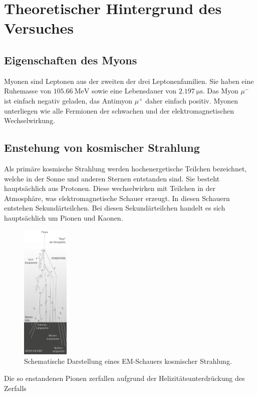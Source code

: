 \section{Theoretischer Hintergrund des Versuches}
\label{sec:Theorie}
\subsection{Eigenschaften des Myons}
\label{subsec:Eigenschaften}
Myonen sind Leptonen aus der zweiten der drei Leptonenfamilien. Sie haben
eine Ruhemasse von $\SI{105.66}{\mega\electronvolt}$ sowie eine Lebensdauer
von $\SI{2.197}{\micro\second}$. Das Myon $\mu^{-}$ ist einfach negativ geladen,
das Antimyon $\mu^{+}$ daher einfach positiv.\cite{PDG}
Myonen unterliegen wie alle Fermionen der schwachen und der elektromagnetischen
Wechselwirkung.
\subsection{Enstehung von kosmischer Strahlung}
\label{subsec:kosmischeStrahlung}
Als primäre kosmische Strahlung werden hochenergetische Teilchen bezeichnet, welche
in der Sonne und anderen Sternen entstanden sind. Sie besteht hauptsächlich aus Protonen.
Diese wechselwirken mit Teilchen in der Atmosphäre, was elektromagnetische
Schauer erzeugt. In diesen Schauern entstehen Sekundärteilchen. Bei diesen
Sekundärteilchen handelt es sich hauptsächlich um Pionen und Kaonen.
\begin{figure}
  \centering
  \includegraphics[width=0.2\textwidth]{pictures/Schauer.png}
  \caption{Schematische Darstellung eines EM-Schauers kosmischer Strahlung. \cite{Q1}}
  \label{fig:schauer}
\end{figure}
\noindent
Die so enstandenen Pionen zerfallen aufgrund der Helizitätsunterdrückung
des Zerfalls
